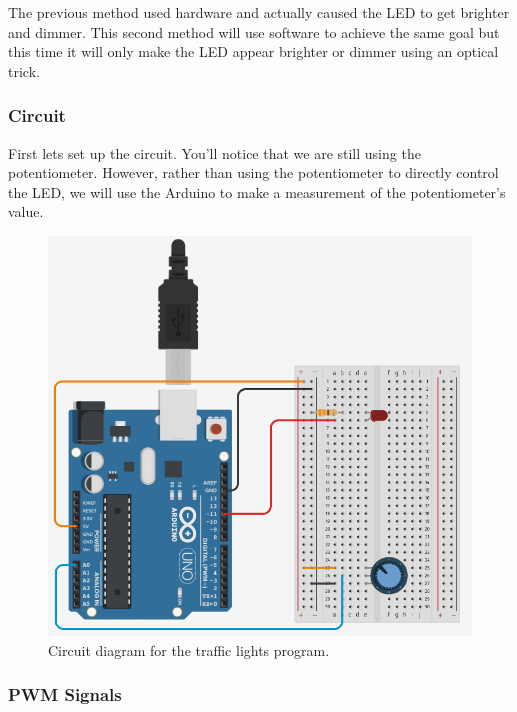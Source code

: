 \documentclass[12pt]{article}
\begin{document}
	The previous method used hardware and actually caused the LED to get brighter and dimmer. This second method will use software to achieve the same goal but this time it will only make the LED appear brighter or dimmer using an optical trick.
	
	\subsubsection{Circuit}
	
	First lets set up the circuit. You'll notice that we are still using the potentiometer. However, rather than using the potentiometer to directly control the LED, we will use the Arduino to make a measurement of the potentiometer's value.
	
	\begin{figure}[H]
		\begin{center}
			\includegraphics[scale=0.5]{LED_brightness_pwm}
			\caption{Circuit diagram for the traffic lights program.}
			\label{fig:circuit_pwm_brightness_ctrl}
		\end{center}
	\end{figure}

	\subsubsection{PWM Signals}
	
\end{document}
